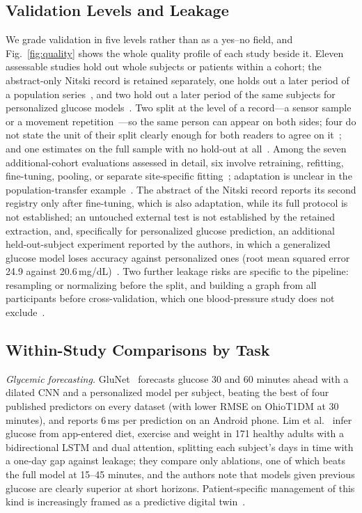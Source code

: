 \documentclass[journal]{IEEEtran}
\begin{document}
\subsection{Validation Levels and Leakage}
\label{sec:quality}
We grade validation in five levels rather than as a yes--no field, and Fig.~\ref{fig:quality} shows the whole quality profile of each study beside it. Eleven assessable studies hold out whole subjects or patients within a cohort; the abstract-only Nitski record is retained separately, one holds out a later period of a population series~\cite{3}, and two hold out a later period of the same subjects for personalized glucose models~\cite{Li2020GluNet,Lim2025VirtualCGM}. Two split at the level of a record---a sensor sample~\cite{liu2025sleepposture} or a movement repetition~\cite{lin2024smapen}---so the same person can appear on both sides; four do not state the unit of their split clearly enough for both readers to agree on it~\cite{zhu2024ippg,2,5,hussein2022seizure}; and one estimates on the full sample with no hold-out at all~\cite{XiaoLi2016DiabetesSpatiotemporal}. Among the seven additional-cohort evaluations assessed in detail, six involve retraining, refitting, fine-tuning, pooling, or separate site-specific fitting~\cite{2,4,Li2020GluNet,lin2022deep,liu2024cignn,hussein2022seizure}; adaptation is unclear in the population-transfer example~\cite{3}. The abstract of the Nitski record reports its second registry only after fine-tuning, which is also adaptation, while its full protocol is not established; an untouched external test is not established by the retained extraction, and, specifically for personalized glucose prediction, an additional held-out-subject experiment reported by the authors, in which a generalized glucose model loses accuracy against personalized ones (root mean squared error 24.9 against 20.6\,mg/dL)~\cite{Li2020GluNet}. Two further leakage risks are specific to the pipeline: resampling or normalizing before the split, and building a graph from all participants before cross-validation, which one blood-pressure study does not exclude~\cite{liu2024cignn}.

\subsection{Within-Study Comparisons by Task}
\label{sec:withinstudy}
\emph{Glycemic forecasting.} GluNet~\cite{Li2020GluNet} forecasts glucose 30 and 60 minutes ahead with a dilated CNN and a personalized model per subject, beating the best of four published predictors on every dataset (with lower RMSE on OhioT1DM at 30 minutes), and reports 6\,ms per prediction on an Android phone. Lim et al.~\cite{Lim2025VirtualCGM} infer glucose from app-entered diet, exercise and weight in 171 healthy adults with a bidirectional LSTM and dual attention, splitting each subject's days in time with a one-day gap against leakage; they compare only ablations, one of which beats the full model at 15--45 minutes, and the authors note that models given previous glucose are clearly superior at short horizons. Patient-specific management of this kind is increasingly framed as a predictive digital twin~\cite{Faruqui2024}.
\end{document}
